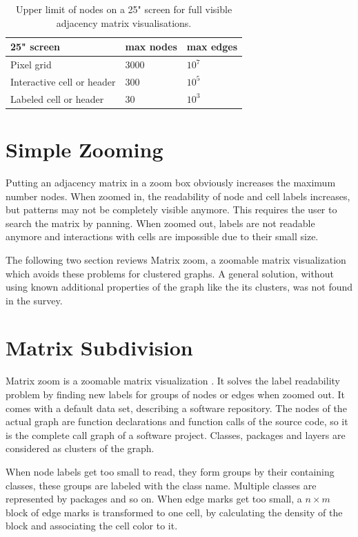  
\begin{table}[]
\centering
\begin{tabular}{|l|l|l|}
\hline
25" screen                 & max nodes & max edges                \\ \hline
Pixel grid                 & 3000      & $10^7$                     \\ \hline
Interactive cell or header & 300       & $10^5$                     \\ \hline
Labeled cell or header     & 30        & $10^3$                     \\ \hline
\end{tabular}
\caption{Upper limit of nodes on a 25" screen for full visible adjacency matrix visualisations.}
\label{my-label}
\end{table}



\section{Simple Zooming}
Putting an adjacency matrix in a zoom box obviously increases the maximum number nodes. 
When zoomed in, the readability of node and cell labels increases, but patterns may not be completely visible anymore. This requires the user to search the matrix by panning. When zoomed out, labels are not readable anymore and interactions with cells are impossible due to their small size. 

The following two section reviews Matrix zoom, a zoomable matrix visualization which avoids these problems for clustered graphs. A general solution, without using known additional properties of the graph like the its clusters, was not found in the survey.

\section{Matrix Subdivision}

Matrix zoom is a zoomable matrix visualization \citep{ham-ivis-2003}. It solves the label readability problem by finding new labels for groups of nodes or edges when zoomed out. It comes with a default data set, describing a software repository. The nodes of the actual graph are function declarations and function calls of the source code, so it is the complete call graph of a software project. Classes, packages and layers are considered as clusters of the graph. 

When node labels get too small to read, they form groups by their containing classes, these groups are labeled with the class name. Multiple classes are represented by packages and so on. When edge marks get too small, a $n \times m$ block of edge marks is transformed to one cell, by calculating the density of the block and associating the cell color to it.

